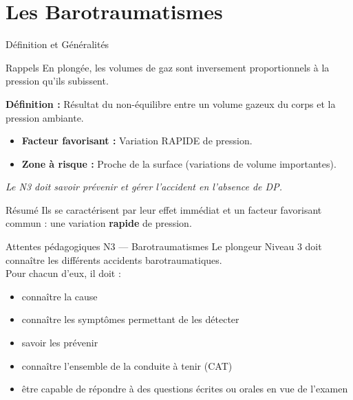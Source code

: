 \section{Les Barotraumatismes}

\begin{frame}{Définition et Généralités}
    \begin{block}{Rappels}
        En plongée, les volumes de gaz sont inversement proportionnels à la pression qu'ils subissent.
    \end{block}

    \vspace{0.3cm}

    \textbf{Définition :} Résultat du non-équilibre entre un volume gazeux du corps et la pression ambiante.
    
    \begin{itemize}
        \item \textbf{Facteur favorisant :} Variation RAPIDE de pression.
        \item \textbf{Zone à risque :} Proche de la surface (variations de volume importantes).
    \end{itemize}
    
    \textit{Le N3 doit savoir prévenir et gérer l'accident en l'absence de DP.}

    \vspace{0.4cm}
    
    \begin{block}{Résumé}
        Ils se caractérisent par leur effet immédiat et un facteur favorisant commun : une variation \textbf{rapide} de pression.
    \end{block}
\end{frame}

\begin{frame}{Attentes pédagogiques N3 — Barotraumatismes}
    Le plongeur Niveau 3 doit connaître les différents accidents barotraumatiques.\\
    Pour chacun d'eux, il doit :
    \begin{itemize}
        \item connaître la cause
        \item connaître les symptômes permettant de les détecter
        \item savoir les prévenir
        \item connaître l'ensemble de la conduite à tenir (CAT)
        \item être capable de répondre à des questions écrites ou orales en vue de l'examen
    \end{itemize}
\end{frame}

